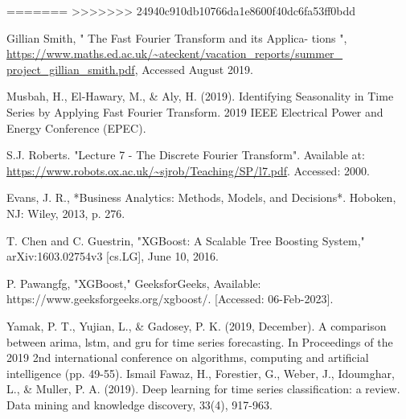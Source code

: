 \documentclass{ieeeojies}
\begin{document}
\begin{thebibliography}{00}
=======
>>>>>>> 24940c910db10766da1e8600f40dc6fa53ff0bdd


Gillian Smith, " The Fast Fourier Transform and its Applica-
tions ",\url{ https://www.maths.ed.ac.uk/~ateckent/vacation_reports/summer_ project_gillian_smith.pdf}, Accessed August 2019.

Musbah, H., El-Hawary, M., \& Aly, H. (2019). Identifying Seasonality in
Time Series by Applying Fast Fourier Transform. 2019 IEEE Electrical
Power and Energy Conference (EPEC).

S.J. Roberts. "Lecture 7 - The Discrete Fourier Transform". Available at:
\url{https://www.robots.ox.ac.uk/~sjrob/Teaching/SP/l7.pdf}. Accessed: 2000.

Evans, J. R., *Business Analytics: Methods, Models, and Decisions*. Hoboken, NJ: Wiley, 2013, p. 276.

T. Chen and C. Guestrin, "XGBoost: A Scalable Tree Boosting System," arXiv:1603.02754v3 [cs.LG], June 10, 2016.

P. Pawangfg, "XGBoost," GeeksforGeeks, Available: https://www.geeksforgeeks.org/xgboost/. [Accessed: 06-Feb-2023].

Yamak, P. T., Yujian, L., & Gadosey, P. K. (2019, December). A comparison between arima, lstm, and gru for time series forecasting. In Proceedings of the 2019 2nd international conference on algorithms, computing and artificial intelligence (pp. 49-55).
Ismail Fawaz, H., Forestier, G., Weber, J., Idoumghar, L., \& Muller, P. A. (2019). Deep learning for time series classification: a review. Data mining and knowledge discovery, 33(4), 917-963.
\end{thebibliography}






\EOD
\end{document}
